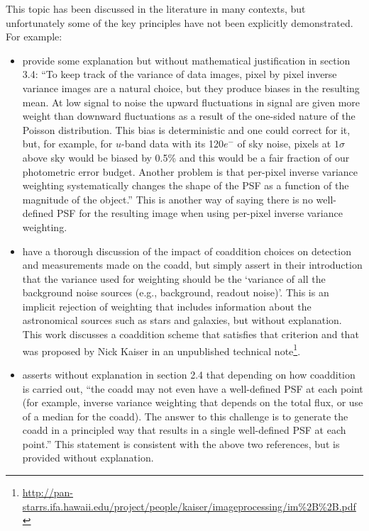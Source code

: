 \documentclass{aastex63}
\begin{document}
This topic has been discussed in the literature in many contexts, but unfortunately some of the key principles have not been explicitly demonstrated.  For example:
\begin{itemize}
\item \citet{2014ApJ...794..120A} provide some explanation but without mathematical justification in section 3.4: ``To keep track of the variance of data images, pixel by
pixel inverse variance images are a natural choice, but
they produce biases in the resulting mean. At low signal to noise the upward fluctuations in signal are given
more weight than downward fluctuations as a result of
the one-sided nature of the Poisson distribution. This
bias is deterministic and one could correct for it, but,
for example, for $u$-band data with its 120$e^{-}$ of sky noise,
pixels at $1\sigma$ above sky would be biased by 0.5\% and this
would be a fair fraction of our photometric error budget. Another problem is that per-pixel inverse variance
weighting systematically changes the shape of the PSF
as a function of the magnitude of the object.''  This is another way of saying there is no well-defined PSF for the resulting image when using per-pixel inverse variance weighting.

\item \citet{2017ApJ...836..187Z} have a thorough discussion of the impact of coaddition choices on detection and measurements made on the coadd, but simply assert in their introduction that the variance used for weighting should be the `variance of all the background noise sources (e.g., background, readout noise)'.  This is an implicit rejection of weighting that includes information about the astronomical sources such as stars and galaxies, but without explanation. This work discusses a coaddition scheme that satisfies that criterion and that was proposed by Nick Kaiser in an unpublished technical note\footnote{\url{http://pan-starrs.ifa.hawaii.edu/project/people/kaiser/imageprocessing/im\%2B\%2B.pdf}}.

    \item \citet{2018ARA&A..56..393M} asserts without explanation in section 2.4 that depending on how coaddition is carried out, ``the coadd may not even have a well-defined PSF at each point (for example, inverse
variance weighting that depends on the total flux, or use of a median for the coadd). The
answer to this challenge is to generate the coadd in a principled way that results in a single
well-defined PSF at each point.'' This statement is consistent with the above two references, but is provided without explanation.


\end{itemize}
\end{document}
